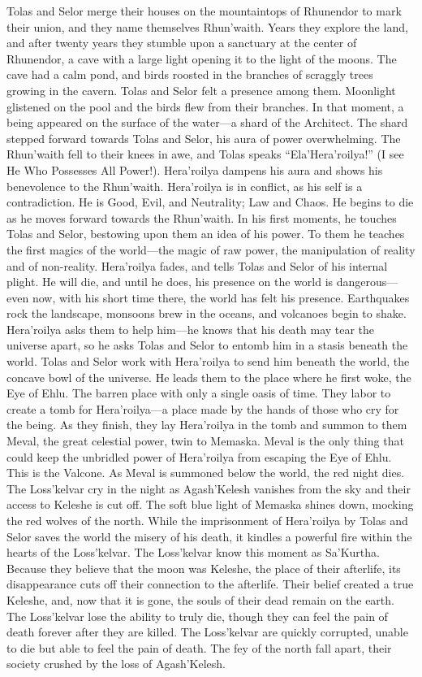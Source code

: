 \documentclass[smalldemyvopaper,11pt,twoside,onecolumn,openright,extrafontsizes]{memoir}
\begin{document}
{{Tolas and Selor merge their houses on the mountaintops of Rhunendor to mark their union, and they name themselves Rhun’waith. Years they explore the land, and after twenty years they stumble upon a sanctuary at the center of Rhunendor, a cave with a large light opening it to the light of the moons. The cave had a calm pond, and birds roosted in the branches of scraggly trees growing in the cavern. Tolas and Selor felt a presence among them. Moonlight glistened on the pool and the birds flew from their branches. In that moment, a being appeared on the surface of the water—a shard of the Architect. The shard stepped forward towards Tolas and Selor, his aura of power overwhelming. The Rhun’waith fell to their knees in awe, and Tolas speaks “Ela’Hera’roilya!” (I see He Who Possesses All Power!). Hera’roilya dampens his aura and shows his benevolence to the Rhun’waith.
Hera’roilya is in conflict, as his self is a contradiction. He is Good, Evil, and Neutrality; Law and Chaos. He begins to die as he moves forward towards the Rhun’waith. In his first moments, he touches Tolas and Selor, bestowing upon them an idea of his power. To them he teaches the first magics of the world—the magic of raw power, the manipulation of reality and of non-reality. Hera’roilya fades, and tells Tolas and Selor of his internal plight. He will die, and until he does, his presence on the world is dangerous—even now, with his short time there, the world has felt his presence. Earthquakes rock the landscape, monsoons brew in the oceans, and volcanoes begin to shake.
Hera’roilya asks them to help him—he knows that his death may tear the universe apart, so he asks Tolas and Selor to entomb him in a stasis beneath the world. Tolas and Selor work with Hera’roilya to send him beneath the world, the concave bowl of the universe. He leads them to the place where he first woke, the Eye of Ehlu. The barren place with only a single oasis of time. They labor to create a tomb for Hera’roilya—a place made by the hands of those who cry for the being. As they finish, they lay Hera’roilya in the tomb and summon to them Meval, the great celestial power, twin to Memaska. Meval is the only thing that could keep the unbridled power of Hera’roilya from escaping the Eye of Ehlu. This is the Valcone. As Meval is summoned below the world, the red night dies. The Loss’kelvar cry in the night as Agash’Kelesh vanishes from the sky and their access to Keleshe is cut off. The soft blue light of Memaska shines down, mocking the red wolves of the north. While the imprisonment of Hera’roilya by Tolas and Selor saves the world the misery of his death, it kindles a powerful fire within the hearts of the Loss’kelvar. The Loss’kelvar know this moment as Sa’Kurtha. Because they believe that the moon was Keleshe, the place of their afterlife, its disappearance cuts off their connection to the afterlife. Their belief created a true Keleshe, and, now that it is gone, the souls of their dead remain on the earth. The Loss’kelvar lose the ability to truly die, though they can feel the pain of death forever after they are killed. The Loss’kelvar are quickly corrupted, unable to die but able to feel the pain of death. The fey of the north fall apart, their society crushed by the loss of Agash’Kelesh.
}}
\end{document}
